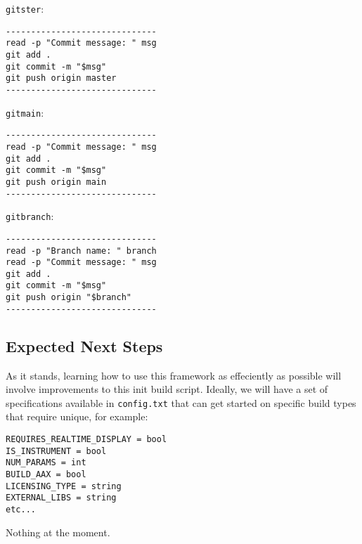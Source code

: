\documentclass[twocolumn,natbib]{svjour3}        %
\begin{document}
\vspace{1em}

\texttt{gitster}:
\begin{verbatim}
------------------------------
read -p "Commit message: " msg
git add .
git commit -m "$msg"
git push origin master
------------------------------
\end{verbatim}

\vspace{1em}

\texttt{gitmain}:
\begin{verbatim}
------------------------------
read -p "Commit message: " msg
git add .
git commit -m "$msg"
git push origin main
------------------------------
\end{verbatim}

\vspace{1em}

\texttt{gitbranch}:
\begin{verbatim}
------------------------------
read -p "Branch name: " branch
read -p "Commit message: " msg
git add .
git commit -m "$msg"
git push origin "$branch"
------------------------------
\end{verbatim}
\subsection{Expected Next Steps}
As it stands, learning how to use this framework as effeciently as possible will involve improvements to this init build script. Ideally, we will have a set of specifications available in \texttt{config.txt} that can get started on specific build types that require unique, for example:
\begin{verbatim}
REQUIRES_REALTIME_DISPLAY = bool
IS_INSTRUMENT = bool
NUM_PARAMS = int
BUILD_AAX = bool
LICENSING_TYPE = string
EXTERNAL_LIBS = string
etc...
\end{verbatim}




\phantom{.}

Nothing at the moment.
\end{document}
